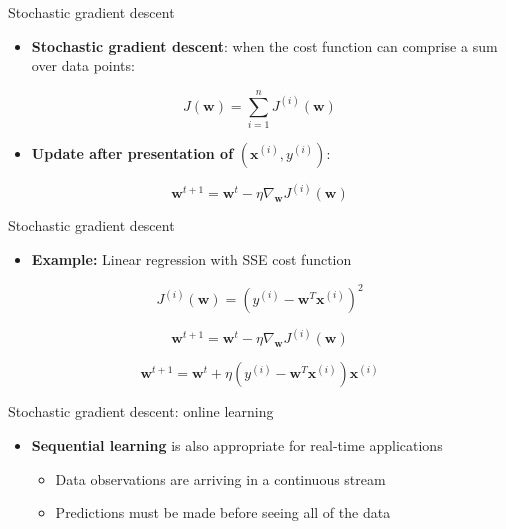 \documentclass[serif, aspectratio=169]{beamer}
\begin{document}
\begin{frame}{Stochastic gradient descent}

\begin{itemize}
    \item \textbf{Stochastic gradient descent}: when the cost function can comprise a sum over data points:
\end{itemize}

\[
J(\mathbf{w}) = \sum_{i=1}^{n} J^{(i)}(\mathbf{w})
\]

\begin{itemize}
    \item \textbf{Update after presentation of} $(\mathbf{x}^{(i)}, y^{(i)})$:
\end{itemize}

\[
\mathbf{w}^{t+1} = \mathbf{w}^t - \eta \nabla_{\mathbf{w}} J^{(i)}(\mathbf{w})
\]

\end{frame}

\begin{frame}{Stochastic gradient descent}

\begin{itemize}
    \item \textbf{Example:} Linear regression with SSE cost function
\end{itemize}

\[
J^{(i)}(\mathbf{w}) = \left( y^{(i)} - \mathbf{w}^T \mathbf{x}^{(i)} \right)^2
\]

\[
\mathbf{w}^{t+1} = \mathbf{w}^t - \eta \nabla_{\mathbf{w}} J^{(i)}(\mathbf{w})
\]

\[
\mathbf{w}^{t+1} = \mathbf{w}^t + \eta \left( y^{(i)} - \mathbf{w}^T \mathbf{x}^{(i)} \right) \mathbf{x}^{(i)}
\]

\end{frame}



\begin{frame}{Stochastic gradient descent: online learning}

\begin{itemize}
    \item \textbf{Sequential learning} is also appropriate for real-time applications
    \begin{itemize}
        \item Data observations are arriving in a continuous stream
        \item Predictions must be made before seeing all of the data
    \end{itemize}
\end{itemize}

\end{frame}
\end{document}
